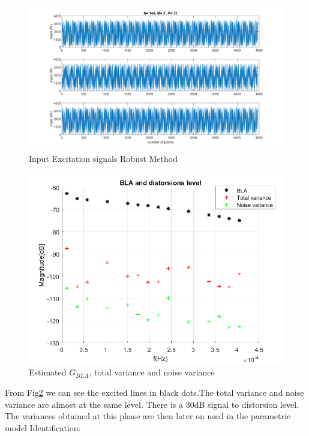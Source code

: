 \documentclass[a4paper,12pt]{article}
\numberwithin{equation}{section}
\begin{document}
\begin{figure}[H]
    \includegraphics[width=\textwidth]{multisine.png}
    \caption{Input Excitation signals Robust Method}
    \label{fig:multisine}
\end{figure}

\begin{figure}[H]
    \includegraphics[width=\textwidth]{bla.png}
    \caption{Estimated $G_{BLA}$, total variance and noise variance}
    \label{fig:BLA}
\end{figure}

From Fig\ref{fig:BLA} we can see the excited lines in black dots.The total variance and noise variance are almost at  the same level. There is a 30dB signal to distorsion level. The variances obtained at this phase are then later on used in the parametric model Identification. 
\end{document}
